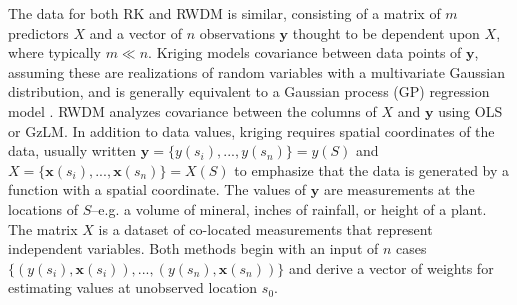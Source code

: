 \documentclass[draft]{article}
\begin{document}

The data for both RK and RWDM is similar, consisting of a matrix of $m$ predictors $X$ and a vector of $n$ observations $\bm{y}$ thought to be dependent upon $X$, where typically $m \ll n$.  Kriging models covariance between data points of $\bm{y}$, assuming these are realizations of random variables with a multivariate Gaussian distribution, and is generally equivalent to a Gaussian process (GP) regression model \cite{rasmussen06}.  RWDM analyzes covariance between the columns of $X$ and $\bm{y}$ using OLS or GzLM.  In addition to data values, kriging requires spatial coordinates of the data, usually written $\bm{y}=\{y(s_i), ..., y(s_n)\}=y(S)$ and $X=\{\bm{x}(s_i), ..., \bm{x}(s_n)\}=X(S)$ to emphasize that the data is generated by a function with a spatial coordinate.  The values of $\bm{y}$ are measurements at the locations of $S$--e.g. a volume of mineral, inches of rainfall, or height of a plant.  The matrix $X$ is a dataset of co-located measurements that represent independent variables.  Both methods begin with an input of $n$ cases $\{(y(s_i), \bm{x}(s_i)), ..., (y(s_n), \bm{x}(s_n))\}$ and derive a vector of weights for estimating values at unobserved location $s_0$.
\end{document}

